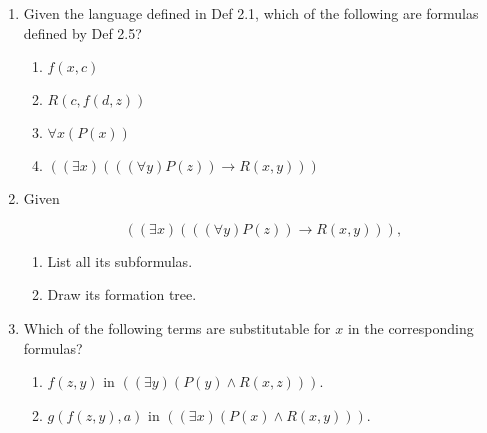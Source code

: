 \documentclass[12pt, letterpaper]{article}
\begin{document}
\begin{enumerate}
\item Given the language defined in Def 2.1, which of the following
are formulas defined by Def 2.5?

  \begin{enumerate}
    \item $f(x,c)$
    \item $R(c, f(d,z))$
    \item $\forall x (P(x))$
    \item $((\exists x)(((\forall y)P(z)) \rightarrow R(x,y)))$
  \end{enumerate}
\item Given

$$((\exists x)(((\forall y)P(z)) \rightarrow R(x,y))),$$
  \begin{enumerate}
    \item List all its subformulas.
    \item Draw its formation tree.
  \end{enumerate}

\item Which of the following terms are substitutable for $x$ in the
corresponding formulas?
  \begin{enumerate}
    \item $f(z,y)$ in $((\exists y)(P(y) \land R(x,z))).$
    \item $g(f(z,y),a)$ in $((\exists x)(P(x) \land R(x,y))).$
  \end{enumerate}


\end{enumerate}
\end{document}
